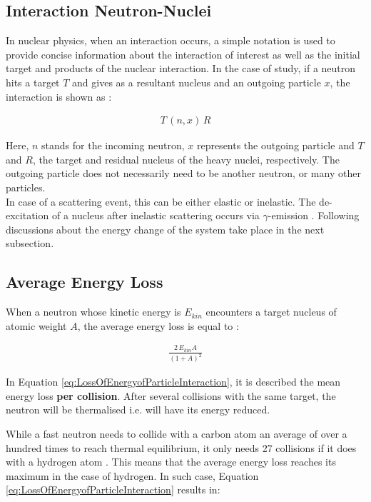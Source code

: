 \subsection{Interaction Neutron-Nuclei}

In nuclear physics, when an interaction occurs, a simple notation is used to provide concise information about the interaction of interest as well as the initial target and products of the nuclear interaction. In the case of study, if a neutron hits a target $T$ and gives as a resultant nucleus and an outgoing particle $x$, the interaction is shown as \cite{PhDThesisofLucasSommer}:

\begin{align} \label{eq1:NuclearReactionNomenclature}
    T\,(n,x)\,R
\end{align}

Here, $n$ stands for the incoming neutron, $x$ represents the outgoing particle and $T$ and $R$, the target and residual nucleus of the heavy nuclei, respectively. The outgoing particle does not necessarily need to be another neutron, or many other particles.\\

In case of a scattering event, this can be either elastic or inelastic. The de-excitation of a nucleus after inelastic scattering occurs via $\gamma$-emission \cite{PhDThesisofLucasSommer}. Following discussions about the energy change of the system take place in the next subsection. 

\subsection{Average Energy Loss}
When a neutron whose kinetic energy is $E_{kin}$ encounters a target nucleus of atomic weight $A$, the average energy loss is equal to \cite{rinard1991neutron}:

\begin{align}
\label{eq:LossOfEnergyofParticleInteraction}
    \frac{2\,E_{kin} A}{(1+A)^2}
\end{align}

In Equation \ref{eq:LossOfEnergyofParticleInteraction}, it is described the mean energy loss \textbf{per collision}. After several collisions with the same target, the neutron will be thermalised i.e. will have its energy reduced. 

While a fast neutron needs to collide with a carbon atom an average of over a hundred times to reach thermal equilibrium, it only needs 27 collisions if it does with a hydrogen atom \cite{rinard1991neutron}. This means that the average energy loss reaches its maximum in the case of hydrogen. In such case, Equation \ref{eq:LossOfEnergyofParticleInteraction} results in:

